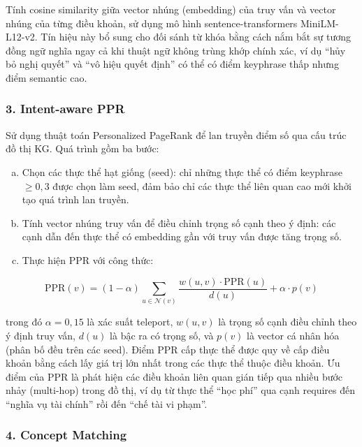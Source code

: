 Tính cosine similarity giữa vector nhúng (embedding) của truy vấn và vector nhúng
của từng điều khoản, sử dụng mô hình sentence-transformers MiniLM-L12-v2. Tín hiệu
này bổ sung cho đối sánh từ khóa bằng cách nắm bắt sự tương đồng ngữ nghĩa ngay
cả khi thuật ngữ không trùng khớp chính xác, ví dụ ``hủy bỏ nghị quyết'' và ``vô
hiệu quyết định'' có thể có điểm keyphrase thấp nhưng điểm semantic cao.

\subsubsection*{3. Intent-aware PPR}

Sử dụng thuật toán Personalized PageRank \cite{haveliwala2002ppr} để lan truyền
điểm số qua cấu trúc đồ thị KG. Quá trình gồm ba bước:

\begin{enumerate}[a)]
  \item Chọn các thực thể hạt giống (seed): chỉ những thực thể có điểm keyphrase
        $\geq 0{,}3$ được chọn làm seed, đảm bảo chỉ các thực thể liên quan cao
        mới khởi tạo quá trình lan truyền.

  \item Tính vector nhúng truy vấn để điều chỉnh trọng số cạnh theo ý định: các
        cạnh dẫn đến thực thể có embedding gần với truy vấn được tăng trọng số.

  \item Thực hiện PPR với công thức:
\end{enumerate}

\begin{equation}
  \text{PPR}(v) = (1 - \alpha) \sum_{u \in \mathcal{N}(v)}
                  \frac{w(u,v) \cdot \text{PPR}(u)}{d(u)}
                  + \alpha \cdot p(v)
  \label{eq:ppr}
\end{equation}

\noindent trong đó $\alpha = 0{,}15$ là xác suất teleport, $w(u,v)$ là trọng số
cạnh điều chỉnh theo ý định truy vấn, $d(u)$ là bậc ra có trọng số, và $p(v)$ là
vector cá nhân hóa (phân bố đều trên các seed). Điểm PPR cấp thực thể được quy về
cấp điều khoản bằng cách lấy giá trị lớn nhất trong các thực thể thuộc điều khoản.
Ưu điểm của PPR là phát hiện các điều khoản liên quan gián tiếp qua nhiều bước
nhảy (multi-hop) trong đồ thị, ví dụ từ thực thể ``học phí'' qua cạnh requires đến
``nghĩa vụ tài chính'' rồi đến ``chế tài vi phạm''.

\subsubsection*{4. Concept Matching}

